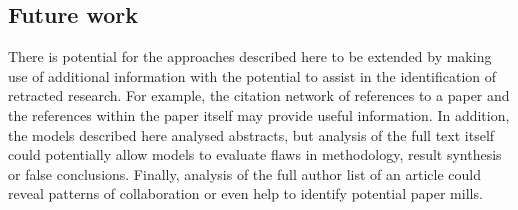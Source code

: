 \documentclass[pdflatex,sn-mathphys-num]{sn-jnl}%
\begin{document}

\subsection{Future work}

There is potential for the approaches described here to be extended by making use of additional information with the potential to assist in the identification of retracted research. For example, the citation network of references to a paper and the references within the paper itself may provide useful information. In addition, the models described here analysed abstracts, but analysis of the full text itself could potentially allow models to evaluate flaws in methodology, result synthesis or false conclusions. Finally, analysis of the full author list of an article could reveal patterns of collaboration or even help to identify potential paper mills. 



\end{document}
